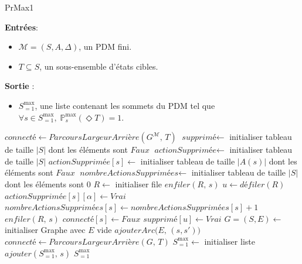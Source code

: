 \documentclass[12pt,a4paper]{report}
\theoremstyle{definition}%
\theoremstyle{remark}
\newcommand{\pr}{\mathbb{P}}
\let\labelitemi\labelitemii
\begin{document}
\begin{algorithm}[H]
\caption{PrMax1}
\hspace*{\algorithmicindent} \textbf{Entrées}:
	\begin{itemize}
		\renewcommand{\labelitemi}{\tiny$\bullet$}
		\item $\mathcal{M} = (S, A, \Delta)$, un PDM fini.
		\item $T \subseteq S$, un sous-ensemble d'états cibles.
	\end{itemize}
\hspace*{\algorithmicindent} \textbf{Sortie} :
\begin{itemize}
	\renewcommand{\labelitemi}{\tiny$\bullet$}
	\item $S^{\max}_{=1}$, une liste contenant les sommets du PDM tel que $\forall s \in S^{\max}_{=1},
		\; \pr_{s}^{\max} (\Diamond T)= 1$.
\end{itemize}
\begin{algorithmic}[1]
\STATE $\textit{connecté} \gets \textit{ParcoursLargeurArrière}(G^\mathcal{M},\, T)$
\STATE $\textit{supprimé} \gets$ initialiser tableau de taille $|S|$ dont
	les éléments sont $Faux$
\STATE $\textit{actionSupprimée} \gets$ initialiser tableau de taille
	$|S|$
	\STATE $\textit{actionSupprimée}[s] \gets$ {\small initialiser tableau de taille $|A(s)|$
		dont les éléments sont $Faux$}
\ENDFOR
\STATE $\textit{nombreActionsSupprimées} \gets$ {\small initialiser tableau de taille $|S|$ dont les éléments sont $0$}
	\STATE $R \gets $ initialiser file
			\STATE $enfiler(R, \, s)$
		\ENDIF
	\ENDFOR
		\STATE $u \gets \textit{défiler}(R)$
				\STATE $\textit{actionSupprimée}[s][\alpha] \gets Vrai$
				\STATE $\textit{nombreActionsSupprimées}[s] \gets \textit{nombreActionsSupprimées}[s] + 1$
					\STATE $enfiler(R, \, s)$
					\STATE $\textit{connecté}[s] \gets Faux$
				\ENDIF
			\ENDIF
		\ENDFOR
		\STATE $\textit{supprimé}[u] \gets Vrai$
	\ENDWHILE
	\STATE $G = (S, E) \gets $initialiser Graphe avec $E$ vide
							\STATE $ajouterArc\big(E,\, (s, s') \big)$
						\ENDIF
					\ENDFOR
				\ENDIF
			\ENDFOR
		\ENDIF
	\ENDFOR
	\STATE $\textit{connecté} \gets \textit{ParcoursLargeurArrière}(G, \, T)$
\ENDWHILE
\STATE $S^{\max}_{=1} \gets$ initialiser liste
		\STATE $ajouter(S^{\max}_{=1}, \, s)$
	\ENDIF
\ENDFOR
\RETURN $S^{\max}_{=1}$
\end{algorithmic}
\end{algorithm}
\end{document}
